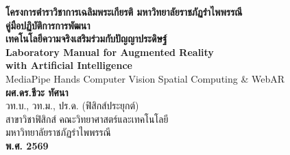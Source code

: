 \begin{titlepage}
\centering
\vspace*{2.0cm}

{\Large\bfseries\color{cyberblue} โครงการตำราวิชาการเฉลิมพระเกียรติ มหาวิทยาลัยราชภัฏรำไพพรรณี}\\[1.5cm]

{\Huge\bfseries\color{cyberdark} คู่มือปฏิบัติการการพัฒนา}\\[0.5cm]
{\Huge\bfseries\color{cyberblue} เทคโนโลยีความจริงเสริมร่วมกับปัญญาประดิษฐ์}\\[0.8cm]

{\LARGE\bfseries Laboratory Manual for Augmented Reality\\with Artificial Intelligence}\\[0.4cm]
{\large\textsf{MediaPipe Hands \enspace\textbullet\enspace Computer Vision \enspace\textbullet\enspace Spatial Computing \& WebAR}}\\[2.5cm]

{\Large\bfseries ผศ.ดร.ชีวะ ทัศนา}\\[0.3cm]
{\large วท.บ., วท.ม., ปร.ด. (ฟิสิกส์ประยุกต์)}\\[0.2cm]
{\normalsize สาขาวิชาฟิสิกส์ คณะวิทยาศาสตร์และเทคโนโลยี}\\[0.2cm]
{\normalsize มหาวิทยาลัยราชภัฏรำไพพรรณี}\\[2.5cm]

\vfill
{\large\bfseries พ.ศ. 2569}
\end{titlepage}
